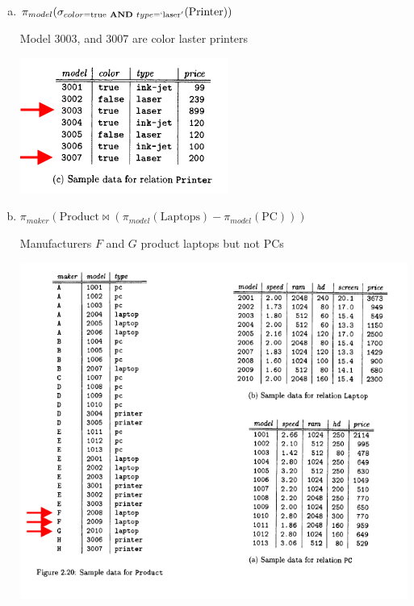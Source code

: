 \documentclass[12pt]{article}
\begin{document}
\begin{enumerate}
\begin{enumerate}[a)]
        \item $\pi_{model} (\sigma_{color = \text{true} \textbf{ AND } type=`\text{laser}'}(\text{Printer}))$

        \bigskip

        Model 3003, and 3007 are color laster printers

        \begin{center}
        \includegraphics[width=0.4\linewidth]{images/worksheet_2_solution_9.png}
        \end{center}

        \item $\pi_{maker}(\text{Product} \bowtie (\pi_{model} (\text{Laptops}) - \pi_{model} (\text{PC})))$

        \bigskip

        Manufacturers $F$ and $G$ product laptops but not PCs

        \begin{center}
        \includegraphics[width=\linewidth]{images/worksheet_2_solution_10.png}
        \end{center}


\end{enumerate}
\end{enumerate}
\end{document}
